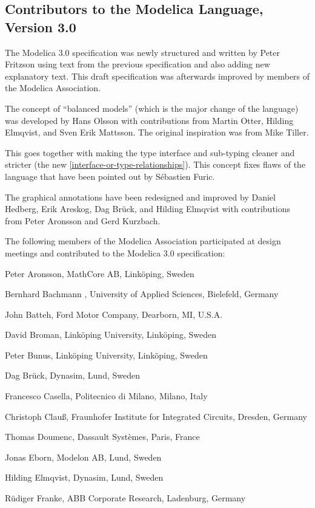 \documentclass[10pt,a4paper]{report}
\def\doublelabel#1{\label{#1}\hypertarget{#1}{}}
\begin{document}
\subsection{Contributors to the Modelica Language, Version 3.0}\doublelabel{contributors-to-the-modelica-language-version-3-0}

The Modelica 3.0 specification was newly structured and written by Peter
Fritzson using text from the previous specification and also adding new
explanatory text. This draft specification was afterwards improved by
members of the Modelica Association.

The concept of ``balanced models'' (which is the major change of the
language) was developed by Hans Olsson with contributions from Martin
Otter, Hilding Elmqvist, and Sven Erik Mattsson. The original
inspiration was from Mike Tiller.

This goes together with making the type interface and sub-typing cleaner
and stricter (the new \ref{interface-or-type-relationships}). This concept fixes flaws of the
language that have been pointed out by Sébastien Furic.

The graphical annotations have been redesigned and improved by Daniel
Hedberg, Erik Areskog, Dag Brück, and Hilding Elmqvist with
contributions from Peter Aronsson and Gerd Kurzbach.

The following members of the Modelica Association participated at design
meetings and contributed to the Modelica 3.0 specification:

Peter Aronsson, MathCore AB, Linköping, Sweden

Bernhard Bachmann , University of Applied Sciences, Bielefeld, Germany

John Batteh, Ford Motor Company, Dearborn, MI, U.S.A.

David Broman, Linköping University, Linköping, Sweden

Peter Bunus, Linköping University, Linköping, Sweden

Dag Brück, Dynasim, Lund, Sweden

Francesco Casella, Politecnico di Milano, Milano, Italy

Christoph Clauß, Fraunhofer Institute for Integrated Circuits, Dresden,
Germany

Thomas Doumenc, Dassault Systèmes, Paris, France

Jonas Eborn, Modelon AB, Lund, Sweden

Hilding Elmqvist, Dynasim, Lund, Sweden

Rüdiger Franke, ABB Corporate Research, Ladenburg, Germany
\end{document}
